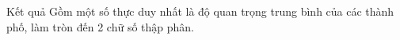 Kết quả
Gồm một số thực duy nhất là độ quan trọng trung bình của các thành phố, làm tròn đến 2 chữ số thập phân.